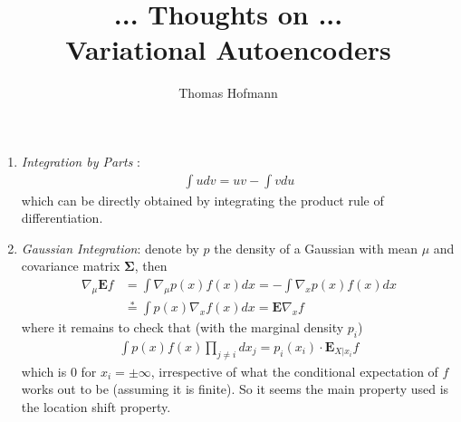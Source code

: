 \documentclass{article}
\title{{\large ... Thoughts on ...} \\ Variational Autoencoders}
\author{Thomas Hofmann}
\newcommand{\E}{{\mathbf E}}
\begin{document}
\maketitle

\begin{enumerate}
\item \textit{Integration by Parts }: 
\begin{align}
\int u dv= u v - \int v du
\end{align}
which can be directly obtained by integrating the product rule of differentiation.
\item \textit{Gaussian Integration}: denote by $p$ the density of a Gaussian with mean $\mu$ and covariance matrix $\mathbf \Sigma$, then 
\begin{align}
\nabla_\mu \E f  & = \int \nabla_\mu p(x)  f(x) dx = - \int \nabla_x p(x) f(x) dx \\
& \stackrel{*}{=} \int  p(x) \nabla_x f(x) dx = \E \nabla_x f
\end{align}
where it remains to check that (with the marginal density $p_i$)
\begin{align}
\int p(x) f(x) \prod_{j \neq i} dx_j = p_i(x_i) \cdot \E_{X|x_i} f
\end{align}
which is $0$ for $x_i= \pm \infty$, irrespective of what the conditional expectation of $f$ works out to be (assuming it is finite). So it seems the main property used is the location shift property.  
\end{enumerate}



\end{document}

